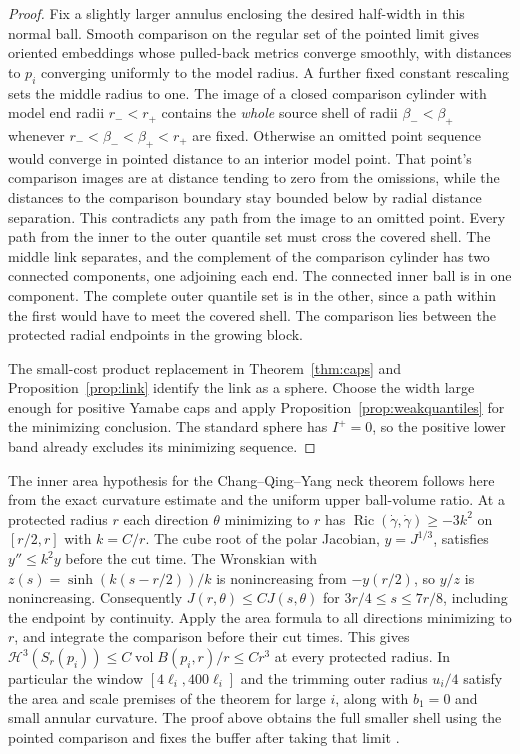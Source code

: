 \documentclass[11pt]{article}
\numberwithin{equation}{section}
\theoremstyle{definition}
\theoremstyle{remark}
\newcommand{\Ric}{\operatorname{Ric}}
\newcommand{\vol}{\operatorname{vol}}
\begin{document}
\begin{proof}
Fix a slightly larger annulus enclosing the desired
half-width in this normal ball. Smooth comparison on the
regular set of the pointed limit gives oriented embeddings
whose pulled-back metrics converge smoothly, with distances
to \(p_i\) converging uniformly to the model radius.
A further fixed constant rescaling sets the middle radius
to one. The image of a closed comparison cylinder with
model end radii \(r_-<r_+\) contains the \emph{whole}
source shell of radii \(\beta_-<\beta_+\) whenever
\(r_-<\beta_-<\beta_+<r_+\) are fixed. Otherwise an omitted
point sequence would converge in pointed distance to an
interior model point. That point's comparison images are
at distance tending to zero from the omissions, while the
distances to the comparison boundary stay bounded below
by radial distance separation. This contradicts any
path from the image to an omitted point. Every path from
the inner to the outer quantile set must cross the covered
shell. The middle link separates, and the complement of the
comparison cylinder has two connected components, one
adjoining each end. The connected inner ball is in one
component. The complete outer quantile set is in the
other, since a path within the first would have to meet
the covered shell. The comparison lies between the protected
radial endpoints in the growing block.

The small-cost product replacement in Theorem~\ref{thm:caps}
and Proposition~\ref{prop:link} identify the link as a
sphere. Choose the width large enough for positive Yamabe
caps and apply Proposition~\ref{prop:weakquantiles} for
the minimizing conclusion. The standard sphere has
\(I^+=0\), so the positive lower band already excludes
its minimizing sequence.
\end{proof}

The inner area hypothesis for the Chang--Qing--Yang
neck theorem follows here from the exact curvature estimate
and the uniform upper ball-volume ratio. At a protected
radius \(r\) each direction \(\theta\) minimizing to \(r\)
has \(\Ric(\dot\gamma,\dot\gamma)\ge-3k^2\) on \([r/2,r]\)
with \(k=C/r\). The cube root of the polar Jacobian,
\(y=J^{1/3}\), satisfies \(y''\le k^2 y\) before the
cut time. The Wronskian with
\(z(s)=\sinh(k(s-r/2))/k\) is nonincreasing from
\(-y(r/2)\), so \(y/z\) is nonincreasing.
Consequently \(J(r,\theta)\le C J(s,\theta)\) for
\(3r/4\le s\le7r/8\), including the endpoint by continuity.
Apply the area formula to all directions minimizing to
\(r\), and integrate the comparison before their cut
times. This gives
\(\mathcal H^3(S_r(p_i))\le C\vol B(p_i,r)/r\le C r^3\)
at every protected radius. In particular the window
\([4\ell_i,400\ell_i]\) and the trimming outer radius
\(u_i/4\) satisfy the area and scale premises of the theorem
for large \(i\), along with \(b_1=0\) and small annular
curvature. The proof above obtains the full smaller shell
using the pointed comparison and fixes the buffer after
taking that limit \cite[Theorem 3.1]{ChangQingYang2006Gap}.
\end{document}
